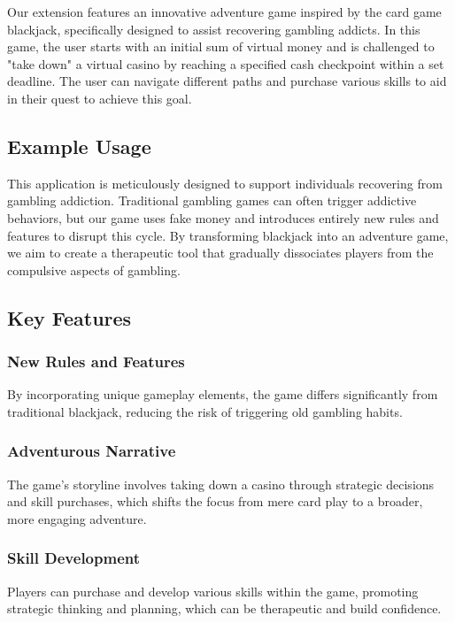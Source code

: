 \documentclass[9pt,a4paper,twoside]{tau-class/tau}
\begin{document}
    Our extension features an innovative adventure game inspired by the card game blackjack, specifically designed to assist recovering gambling addicts. In this game, the user starts with an initial sum of virtual money and is challenged to "take down" a virtual casino by reaching a specified cash checkpoint within a set deadline. The user can navigate different paths and purchase various skills to aid in their quest to achieve this goal. 
    
    \subsection{Example Usage} 
    
    This application is meticulously designed to support individuals recovering from gambling addiction. Traditional gambling games can often trigger addictive behaviors, but our game uses fake money and introduces entirely new rules and features to disrupt this cycle. By transforming blackjack into an adventure game, we aim to create a therapeutic tool that gradually dissociates players from the compulsive aspects of gambling. 
    
    \subsection{Key Features} 
    
    \subsubsection{New Rules and Features}
    By incorporating unique gameplay elements, the game differs significantly from traditional blackjack, reducing the risk of triggering old gambling habits. 
    
    \subsubsection{Adventurous Narrative}
    The game's storyline involves taking down a casino through strategic decisions and skill purchases, which shifts the focus from mere card play to a broader, more engaging adventure. 
    
    \subsubsection{Skill Development}
    Players can purchase and develop various skills within the game, promoting strategic thinking and planning, which can be therapeutic and build confidence. 
    
\end{document}
